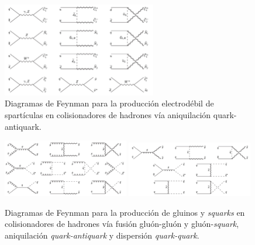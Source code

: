 
\begin{figure}[!htb]
  \centering \includegraphics[width=0.6\textwidth]{figures/figure_101}
  \caption{Diagramas de Feynman para la producción electrodébil de spartículas
    en colisionadores de hadrones vía aniquilación quark-antiquark.}
  \label{fig:ewkprod}
\end{figure}

\begin{figure}[!htb]
  \centering

  \includegraphics[width=0.49\textwidth]{figures/figure_102}
  \includegraphics[width=0.49\textwidth]{figures/figure_103}

  \caption{Diagramas de Feynman para la producción de gluinos y \emph{squarks} en
    colisionadores de hadrones vía fusión gluón-gluón y gluón-\emph{squark},
    aniquilación \emph{quark-antiquark} y dispersión \emph{quark-quark}.}
  \label{fig:strongprod}
\end{figure}

